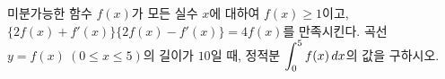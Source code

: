 미분가능한 함수 $f(x)$가 모든 실수 $x$에 대하여 $f(x)\ge 1$이고, $\{2f(x)+f'(x)\}\{2f(x)-f'(x)\}=4f(x)$를 만족시킨다. 곡선 $y=f(x)\ (0\le x\le 5)$의 길이가 $10$일 때, 정적분 $\displaystyle\int_{0}^{5}f(x)\mkern3mu dx$의 값을 구하시오.
